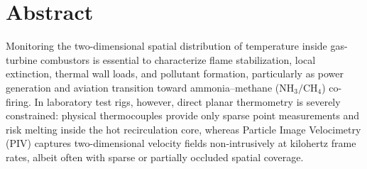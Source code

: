\documentclass{Configuration_Files/PoliMi3i_thesis}
\begin{document}


\pagestyle{empty}
\frontmatter


\startpreamble
\setcounter{page}{1}

\chapter*{Abstract}
Monitoring the two-dimensional spatial distribution of temperature inside gas-turbine combustors is essential to characterize flame stabilization, local extinction, thermal wall loads, and pollutant formation, particularly as power generation and aviation transition toward ammonia--methane ($\text{NH}_3/\text{CH}_4$) co-firing. In laboratory test rigs, however, direct planar thermometry is severely constrained: physical thermocouples provide only sparse point measurements and risk melting inside the hot recirculation core, whereas Particle Image Velocimetry (PIV) captures two-dimensional velocity fields non-intrusively at kilohertz frame rates, albeit often with sparse or partially occluded spatial coverage.
\end{document}
